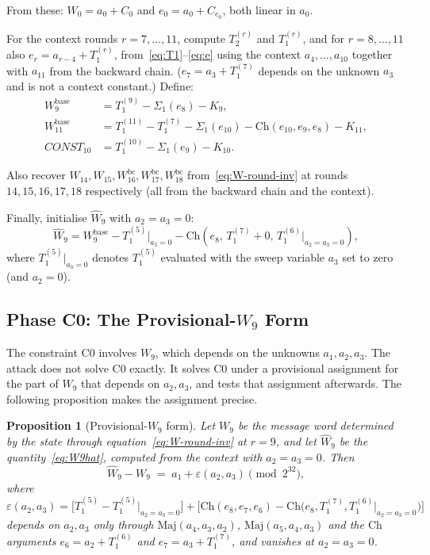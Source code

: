 \documentclass[11pt,a4paper]{article}
\newtheorem{proposition}{Proposition}
\newcommand{\Sig}[1]{\Sigma_{#1}}
\newcommand{\Maj}{\mathrm{Maj}}
\newcommand{\Ch}{\mathrm{Ch}}
\begin{document}
From these: $W_0 = a_0 + C_0$ and $e_0 = a_0 + C_{e_0}$, both
linear in $a_0$.

For the context rounds $r = 7,\ldots,11$, compute $T_2^{(r)}$ and
$T_1^{(r)}$, and for $r=8,\ldots,11$ also $e_r = a_{r-4} + T_1^{(r)}$,
from~\eqref{eq:T1}--\eqref{eq:e} using the context $a_4,\ldots,a_{10}$
together with $a_{11}$ from the backward chain.  ($e_7 = a_3 + T_1^{(7)}$
depends on the unknown $a_3$ and is not a context constant.)
Define:
\begin{align}
  W_9^{\mathrm{base}} &= T_1^{(9)} - \Sig{1}(e_8) - K_9, \label{eq:W9base}\\
  W_{11}^{\mathrm{base}} &= T_1^{(11)} - T_1^{(7)} - \Sig{1}(e_{10})
                             - \Ch(e_{10},e_9,e_8) - K_{11}, \label{eq:W11base}\\
  \mathit{CONST}_{10} &= T_1^{(10)} - \Sig{1}(e_9) - K_{10}. \label{eq:C10}
\end{align}

Also recover $W_{14}, W_{15}, W_{16}^{\mathrm{bc}}, W_{17}^{\mathrm{bc}},
W_{18}^{\mathrm{bc}}$ from~\eqref{eq:W-round-inv} at rounds
$14,15,16,17,18$ respectively (all from the backward chain and the context).

Finally, initialise $\hat{W}_9$ with $a_2 = a_3 = 0$:
\begin{equation}
  \hat{W}_9 = W_9^{\mathrm{base}} - T_1^{(5)}\big|_{a_3=0}
              - \Ch\!\left(e_8,\,T_1^{(7)}+0,\,T_1^{(6)}\big|_{a_2=a_3=0}\right),
  \label{eq:W9hat}
\end{equation}
where $T_1^{(5)}\big|_{a_3=0}$ denotes $T_1^{(5)}$ evaluated with
the sweep variable $a_3$ set to zero (and $a_2 = 0$).

\subsection{Phase C0: The Provisional-\texorpdfstring{$W_9$}{W9} Form}
\label{sec:C0}

The constraint C0 involves $W_9$, which depends on the unknowns
$a_1,a_2,a_3$.  The attack does not solve C0 exactly.  It solves C0 under a
provisional assignment for the part of $W_9$ that depends on $a_2,a_3$, and
tests that assignment afterwards.  The following proposition makes the
assignment precise.

\begin{proposition}[Provisional-$W_9$ form]
\label{lem:w9-diff}
Let $W_9$ be the message word determined by the state through
equation~\eqref{eq:W-round-inv} at $r=9$, and let $\hat{W}_9$ be the
quantity~\eqref{eq:W9hat}, computed from the context with $a_2=a_3=0$.
Then
\[
  \hat{W}_9 - W_9 \;=\; a_1 + \varepsilon(a_2,a_3) \pmod{2^{32}},
\]
where
\[
  \varepsilon(a_2,a_3) = \bigl[T_1^{(5)} - T_1^{(5)}\!\bigr|_{a_2=a_3=0}\bigr]
    + \bigl[\Ch(e_8,e_7,e_6) - \Ch\!\bigl(e_8,T_1^{(7)},T_1^{(6)}\!\bigr|_{a_2=a_3=0}\bigr)\bigr]
\]
depends on $a_2,a_3$ only through $\Maj(a_4,a_3,a_2)$, $\Maj(a_5,a_4,a_3)$
and the $\Ch$ arguments $e_6=a_2+T_1^{(6)}$ and $e_7=a_3+T_1^{(7)}$, and
vanishes at $a_2=a_3=0$.
\end{proposition}
\end{document}
